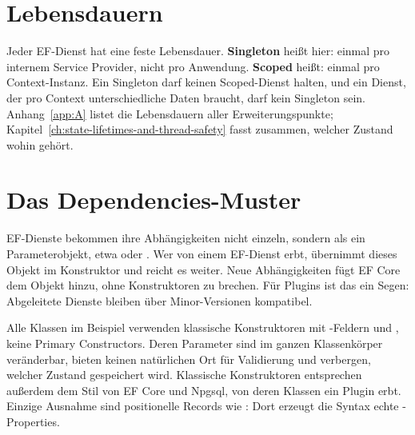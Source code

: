 \section{Lebensdauern}

Jeder EF-Dienst hat eine feste Lebensdauer. \textbf{Singleton} heißt hier: einmal pro
internem Service Provider, nicht pro Anwendung. \textbf{Scoped} heißt: einmal pro
Context-Instanz. Ein Singleton darf keinen Scoped-Dienst halten, und ein Dienst, der pro
Context unterschiedliche Daten braucht, darf kein Singleton sein. Anhang~\ref{app:A} listet
die Lebensdauern aller Erweiterungspunkte; Kapitel~\ref{ch:state-lifetimes-and-thread-safety} fasst zusammen,
welcher Zustand wohin gehört.

\section{Das Dependencies-Muster}

EF-Dienste bekommen ihre Abhängigkeiten nicht einzeln, sondern als ein Parameterobjekt, etwa
 oder
.
Wer von einem EF-Dienst erbt, übernimmt dieses Objekt im Konstruktor und reicht es weiter.
Neue Abhängigkeiten fügt EF Core dem Objekt hinzu, ohne Konstruktoren zu brechen. Für
Plugins ist das ein Segen: Abgeleitete Dienste bleiben über Minor-Versionen kompatibel.

\begin{sourcecode}[Migrations/\allowbreak{}Internal/\allowbreak{}Tenancy\allowbreak{}Migrations\allowbreak{}Sql\allowbreak{}Generator.\allowbreak{}cs (\allowbreak{}Kopf)]{csharp}
public class TenancyMigrationsSqlGenerator : NpgsqlMigrationsSqlGenerator
{
    public TenancyMigrationsSqlGenerator(
        MigrationsSqlGeneratorDependencies dependencies,     // Parameterobjekt von EF
        INpgsqlSingletonOptions npgsqlSingletonOptions)      // zusätzlich vom Provider
        : base(dependencies, npgsqlSingletonOptions)
    {
    }
\end{sourcecode}

\begin{note}
  Alle Klassen im Beispiel verwenden klassische Konstruktoren mit -Feldern und
  ,
  keine Primary Constructors. Deren Parameter sind im ganzen Klassenkörper veränderbar,
  bieten keinen natürlichen Ort für Validierung und verbergen, welcher Zustand gespeichert
  wird. Klassische Konstruktoren entsprechen außerdem dem Stil von EF Core und Npgsql, von
  deren Klassen ein Plugin erbt. Einzige Ausnahme sind positionelle Records wie
  : Dort erzeugt die Syntax echte -Properties.
\end{note}

